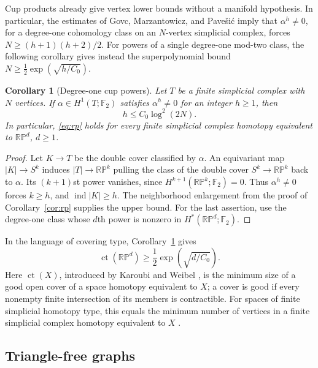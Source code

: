 \documentclass[11pt]{article}
\newtheorem{corollary}[theorem]{Corollary}
\theoremstyle{remark}
\DeclareMathOperator{\ind}{ind}
\newcommand{\RP}{\mathbb {RP}}
\newcommand{\Czero}{C_0}
\begin{document}
Cup products already give vertex lower bounds without a manifold
hypothesis. In particular, the estimates of Govc, Marzantowicz,
and Pave\v{s}i\'c \cite[Theorems~1.2 and~3.5]{GMP} imply that
$\alpha^h\ne0$, for a degree-one cohomology class on an
$N$-vertex simplicial complex, forces
$N\geq(h+1)(h+2)/2$. For powers of a single degree-one
mod-two class, the following corollary gives instead the
superpolynomial bound $N\geq\frac12\exp(\sqrt{h/\Czero})$.

\begin{corollary}[Degree-one cup powers]\label{cor:cup}
Let $T$ be a finite simplicial complex with $N$ vertices.
If $\alpha\in H^1(T;\mathbb F_2)$ satisfies $\alpha^h\ne0$ for an
integer $h\geq1$, then
\begin{equation}\label{eq:cup}
 h\leq\Czero\log^2(2N).
\end{equation}
In particular, \eqref{eq:rp} holds for every finite simplicial complex
homotopy equivalent to $\RP^d$, $d\geq1$.
\end{corollary}

\begin{proof}
Let $K\to T$ be the double cover classified by $\alpha$.
An equivariant map $|K|\to S^k$ induces $|T|\to\RP^k$ pulling
the class of the double cover $S^k\to\RP^k$ back to $\alpha$.
Its $(k+1)$st power vanishes, since $H^{k+1}(\RP^k;\mathbb F_2)=0$.
Thus $\alpha^h\ne0$ forces $k\geq h$, and $\ind|K|\geq h$.
The neighborhood enlargement from the proof of Corollary~\ref{cor:rp}
supplies the upper bound. For the last assertion, use the degree-one
class whose $d$th power is nonzero in $H^*(\RP^d;\mathbb F_2)$.
\end{proof}

In the language of covering type, Corollary~\ref{cor:cup} gives
\[
 \operatorname{ct}(\RP^d)
 \geq \frac12\exp\!\left(\sqrt{d/\Czero}\right).
\]
Here $\operatorname{ct}(X)$, introduced by Karoubi and Weibel
\cite{KW}, is the minimum size of a good open cover of a space
homotopy equivalent to $X$; a cover is good if every nonempty
finite intersection of its members is contractible.
For spaces of finite simplicial homotopy type, this equals the
minimum number of vertices in a finite simplicial complex
homotopy equivalent to $X$ \cite[Theorem~1.2]{GMP}.

\subsection{Triangle-free graphs}\label{sec:graphs}
\end{document}

